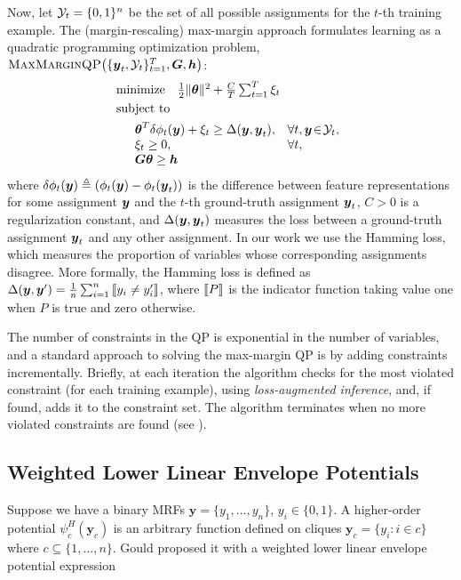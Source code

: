 \documentclass[twoside,doublespace,onecolumn,11pt,a4paper]{book}
\renewcommand{\cite}{\citep}
\newcommand{\mmqp}[3]{\textrm{\sc MaxMarginQP}\!\left(\{\by_t, #1\}_{t=1}^{T}, #2, #3\right)}
\begin{document}
Now, let ${\cal Y}_t = \{0, 1\}^n$ be the set of all possible
assignments for the $t$-th training example. The
(margin-rescaling) max-margin approach formulates learning as a
quadratic programming optimization problem,
$\mmqp{\Y_t}{\bG}{\bh}$:
%
\begin{align}
  & \textrm{minimize} \quad \textstyle \frac{1}{2} \|\boldsymbol{\theta}\|^2 + \frac{C}{T} \sum_{t=1}^{T} \xi_t
  \label{eqn:maxmarginqp} \\
  & \textrm{subject to} \notag \\
  & \begin{array}{lll}
    & \boldsymbol{\theta}^T \delta\phi_t({\boldsymbol{y}}) + \xi_t \geq \Delta({\boldsymbol{y}}, {\boldsymbol{y}}_t), & \forall t, {\boldsymbol{y}} \!\in\! {\cal Y}_t, \\
    & \xi_t \geq 0, & \forall t, \\
    & {\boldsymbol{G}} \boldsymbol{\theta} \geq {\boldsymbol{h}}
  \end{array} \notag
\end{align}
%
where $\delta\phi_t({\boldsymbol{y}}) \triangleq \left(\phi_t({\boldsymbol{y}}) -
  \phi_t({\boldsymbol{y}}_t)\right)$ is the difference between feature
representations for some assignment ${\boldsymbol{y}}$ and the $t$-th
ground-truth assignment ${\boldsymbol{y}}_t$, $C > 0$ is a regularization
constant, and $\Delta({\boldsymbol{y}}, {\boldsymbol{y}}_t)$ measures the loss between a
ground-truth assignment ${\boldsymbol{y}}_t$ and any other assignment. In our
work we use the Hamming loss, which measures the proportion of
variables whose corresponding assignments disagree. More
formally, the Hamming loss is defined as $\Delta(\by, \by') =
\frac{1}{n} \sum_{i=1}^{n} \ind{y_i \neq y'_i}$, where $\ind{P}$
is the indicator function taking value one when $P$ is true and
zero otherwise.

The number of constraints in the QP is exponential in the number
of variables, and a standard approach to solving the max-margin
QP is by adding constraints incrementally. Briefly, at each
iteration the algorithm checks for the most violated constraint
(for each training example), using \emph{loss-augmented
  inference}, and, if found, adds it to the constraint set. The
algorithm terminates when no more violated constraints are found
(see ).



\subsection{Weighted Lower Linear Envelope Potentials}

Suppose we have a binary MRFs $\mathbf{y}=\{y_1,\dots,y_n\}$,
$y_i\in\{0,1\}$. A higher-order potential
$\psi_c^H(\mathbf{y}_c)$ is an arbitrary function defined on
cliques $\mathbf{y}_c=\{y_i : i\in c\}$ where
$c\subseteq\{1,\dots,n\}$. Gould\cite{gouldlearning} proposed it
with a weighted lower linear envelope potential expression
\end{document}
